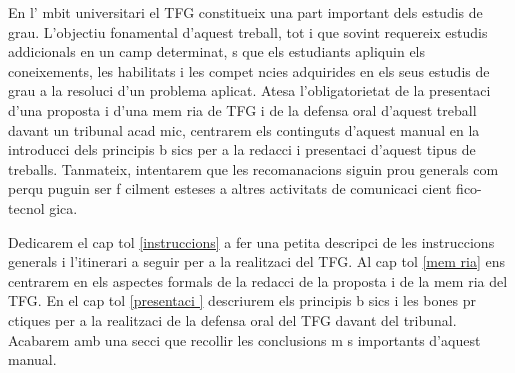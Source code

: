 En l' mbit universitari el \acf{TFG} constitueix una part important dels estudis de grau. L'objectiu fonamental d'aquest treball, tot i que sovint requereix estudis addicionals en un camp determinat,  s que els estudiants apliquin els coneixements, les habilitats i les compet ncies adquirides en els seus estudis de grau a la resoluci  d'un problema aplicat. Atesa l'obligatorietat de la presentaci  d'una proposta i d'una mem ria de \acf{TFG} i de la defensa oral d'aquest treball davant un tribunal acad mic, centrarem els continguts d'aquest manual en la introducci  dels principis b sics per a la redacci  i presentaci  d'aquest tipus de treballs. Tanmateix, intentarem que les recomanacions siguin prou generals com perqu  puguin ser f cilment esteses a altres activitats de comunicaci  cient fico-tecnol gica.

Dedicarem el cap tol \ref{instruccions} a fer una petita descripci  de les instruccions generals i l'itinerari a seguir per a la realitzaci  del \ac{TFG}. Al cap tol \ref{mem ria} ens centrarem en els aspectes formals de la redacci  de la proposta i de la mem ria del \ac{TFG}. En el cap tol \ref{presentaci } descriurem els principis b sics i les bones pr ctiques per a la realitzaci  de la defensa oral del \ac{TFG} davant del tribunal. Acabarem amb una secci  que recollir  les conclusions m s importants d'aquest manual.

